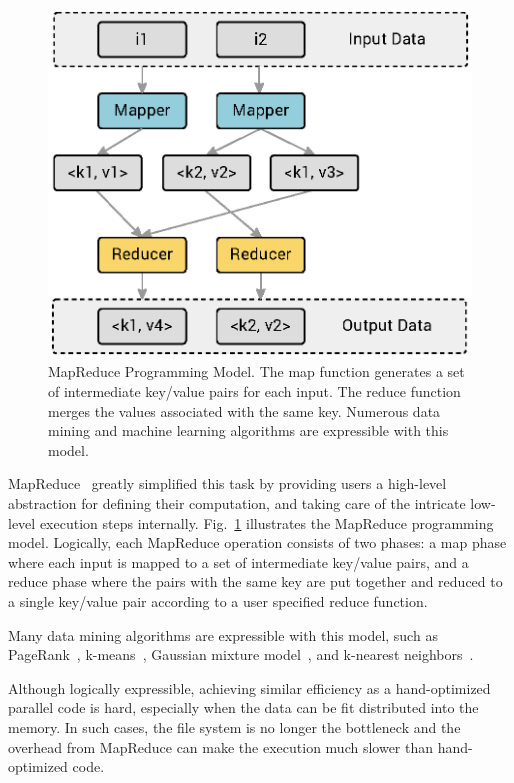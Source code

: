 \begin{figure}
  \begin{center}
  \includegraphics[width=0.7\linewidth]{figs/mr0.eps}
  \end{center}
  \vspace{-0.2cm}
  \caption{MapReduce Programming Model.
  The map function generates a set of intermediate key/value pairs for each input.
  The reduce function merges the values associated with the same key.
  Numerous data mining and machine learning algorithms are expressible with this model.
  }
  \label{fig:mr}
\end{figure}

MapReduce~\cite{dean2008mapreduce,dean2010mapreduce} greatly simplified this task by providing users a high-level abstraction for defining their computation, and taking care of the intricate low-level execution steps internally.
Fig.~\ref{fig:mr} illustrates the MapReduce programming model.
Logically, each MapReduce operation consists of two phases: a map phase where each input is mapped to a set of intermediate key/value pairs, and a reduce phase where the pairs with the same key are put together and reduced to a single key/value pair according to a user specified reduce function.


Many data mining algorithms are expressible with this model, such as PageRank~\cite{bahmani2011fast,plimpton2011mapreduce,ekanayake2010twister}, k-means~\cite{zhao2009parallel,chu2007map,cui2014optimized,anchalia2013mapreduce,gopalani2015comparing}, Gaussian mixture model~\cite{chu2007map}, and k-nearest neighbors~\cite{anchalia2014k,maillo2015mapreduce,lu2012efficient,yokoyama2012processing}.

Although logically expressible, achieving similar efficiency as a hand-optimized parallel code is hard, especially when the data can be fit distributed into the memory.
In such cases, the file system is no longer the bottleneck and the overhead from MapReduce can make the execution much slower than hand-optimized code.

